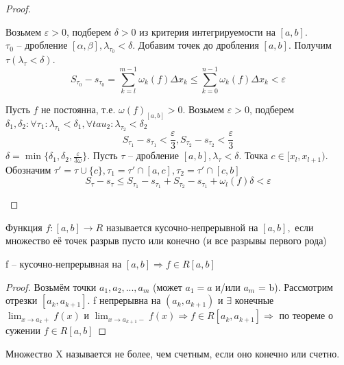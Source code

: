 \begin{proof}
	\begin{MyList}
		\item Возьмем $\varepsilon > 0$, подберем $\delta > 0$ из критерия интегрируемости на $[a, b]$. \\
		$\tau_0$ -- дробление $[\alpha, \beta], \lambda_{\tau_0} < \delta$. Добавим точек до дробления $[a, b]$. Получим $\tau (\lambda_\tau < \delta)$.
		\[S_{\tau_0} - s_{\tau_0} = \sum_{k = l}^{m - 1} \omega_k (f) \Delta x_k \leqslant \sum_{k = 0}^{n - 1} \omega_k (f) \Delta x_k < \varepsilon\]

		\item Пусть $f$ не постоянна, т.е. $\omega(f)_{[a, b]} > 0$.
		Возьмем $\varepsilon > 0$, подберем $\delta_1, \delta_2 : \forall \tau_1 : \lambda_{\tau_1} < \delta_1, \forall tau_2 : \lambda_{\tau_2} < \delta_2$
		\[S_{\tau_1} - s_{\tau_1} < \frac{\varepsilon}{3}, S_{\tau_2} - s_{\tau_2} < \frac{\varepsilon}{3}\]
		$\delta = \min \{\delta_1, \delta_2, \frac{\varepsilon}{3 \omega}\}$. Пусть $\tau$ -- дробление $[a, b], \lambda_\tau < \delta$.
		Точка $c \in [x_l, x_{l + 1})$. Обозначим $\tau' = \tau \cup \{c\}, \tau_1 = \tau' \cap [a, c], \tau_2 = \tau' \cap [c, b]$
		\[S_\tau - s_\tau \leqslant S_{\tau_1} - s_{\tau_1} + S_{\tau_2} - s_{\tau_1} + \omega_l (f) \delta < \varepsilon\]   
	\end{MyList}
\end{proof}

\begin{Def}
	Функция $f:[a,b] \to R$ называется кусочно-непрерывной на $[a,b],$ если множество её точек разрыв пусто или конечно (и все разрывы первого рода)
\end{Def}

\begin{Cons}
	f -- кусочно-непрерывная на $[a, b] \Rightarrow f \in R[a,b]$
\end{Cons}

\begin{proof}
	Возьмём точки $a_1, a_2, ..., a_m$ (может $a_1 = a$ и/или $a_m$ = b). Рассмотрим отрезки $[a_k, a_{k+1}]$. f непрерывна на $(a_k, a_{k+1})$  и $\exists$ 
	конечные $\displaystyle \lim_{x \to a_k+} f(x)$ и $\displaystyle \lim_{x \to a_{k+1}-} f(x) \Rightarrow f \in R[a_k, a_{k+1}] \Rightarrow$  по теореме о сужении $f \in R[a,b]$
\end{proof}

\begin{Def} 
	Множество X называется не более, чем счетным, если оно конечно или счетно. 
\end{Def} 

